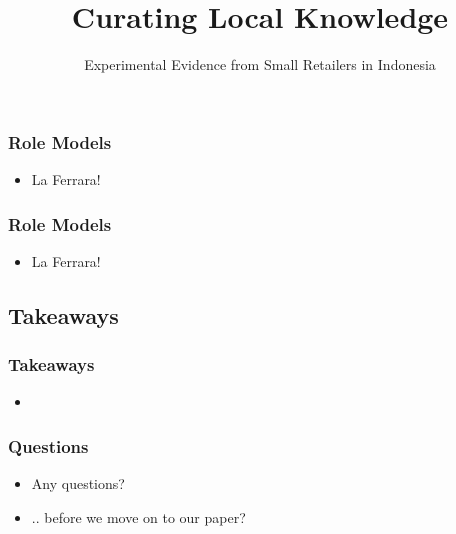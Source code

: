 \documentclass[10pt]{beamer}
\begin{document}
\begin{frame}
\frametitle{Role Models}
	\begin{itemize}
	\item La Ferrara!
	\vspace{0.1in}
	\end{itemize}
\end{frame}

\begin{frame}
\frametitle{Role Models}
	\begin{itemize}
	\item La Ferrara!
	\vspace{0.1in}
	\end{itemize}
\end{frame}



\subsection{Takeaways}

\begin{frame}
\frametitle{Takeaways}
	\begin{itemize}
    \item
   	\vspace{0.10in}
\end{itemize}
\end{frame}

\begin{frame}
\frametitle{Questions}
	\begin{itemize}
	\item Any questions?
	\vspace{0.2in}
	\item[] .. before we move on to our paper?
	\end{itemize}
\end{frame}




\title[Curating Local Knowledge]{Curating Local Knowledge}
\subtitle{Experimental Evidence from Small Retailers in Indonesia}
\end{document}
